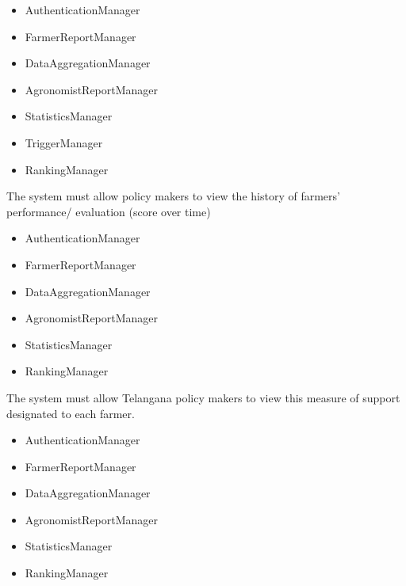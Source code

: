 \begin{itemize}
\begin{itemize}
\item AuthenticationManager
\item FarmerReportManager
\item DataAggregationManager
\item AgronomistReportManager
\item StatisticsManager
\item TriggerManager
\item RankingManager

\end{itemize}
 The system must allow policy makers to view the history of farmers’ performance/ evaluation (score over time)
\begin{itemize}

\item AuthenticationManager
\item FarmerReportManager
\item DataAggregationManager
\item AgronomistReportManager
\item StatisticsManager
\item RankingManager

\end{itemize}
 The system must allow Telangana policy makers to view this measure of support designated to each farmer.
\begin{itemize}

\item AuthenticationManager
\item FarmerReportManager
\item DataAggregationManager
\item AgronomistReportManager
\item StatisticsManager
\item RankingManager

\end{itemize}
\end{itemize}
